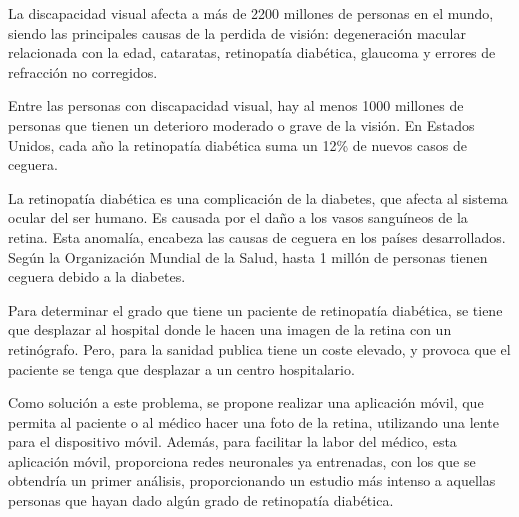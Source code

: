 
La discapacidad visual afecta a más de 2200 millones de personas en el mundo, siendo las principales causas de la perdida de visión: degeneración macular relacionada con la edad, cataratas, retinopatía diabética, glaucoma y errores de refracción no corregidos.


Entre las personas con discapacidad visual, hay al menos 1000 millones de personas que tienen un deterioro moderado o grave de la visión. En Estados Unidos, cada año la retinopatía diabética suma un 12\% de nuevos casos de ceguera.

La retinopatía diabética es una complicación de la diabetes, que afecta al sistema ocular del ser humano. Es causada por el daño a los vasos sanguíneos de la retina. Esta anomalía, encabeza las causas de ceguera en los países desarrollados. Según la Organización Mundial de la Salud, hasta 1 millón de personas tienen ceguera debido a la diabetes. 

Para determinar el grado que tiene un paciente de retinopatía diabética, se tiene que desplazar al hospital donde le hacen una imagen de la retina con un retinógrafo. Pero, para la sanidad publica tiene un coste elevado, y provoca que el paciente se tenga que desplazar a un centro hospitalario. 

Como solución a este problema, se propone realizar una aplicación móvil, que permita al paciente o al médico hacer una foto de la retina, utilizando una lente para el dispositivo móvil. Además, para facilitar la labor del médico, esta aplicación móvil, proporciona redes neuronales ya entrenadas, con los que se obtendría un primer análisis, proporcionando un estudio más intenso a aquellas personas que hayan dado algún grado de retinopatía diabética. 

